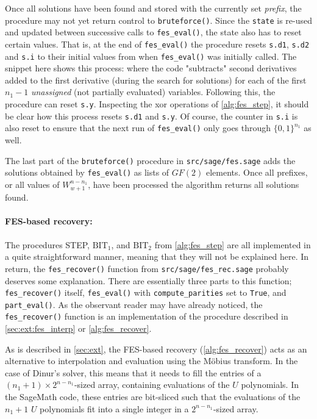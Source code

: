 Once all solutions have been found and stored with the currently set \textit{prefix}, the procedure may not yet return control to \texttt{bruteforce()}. Since the \texttt{state} is re-used and updated between successive calls to \texttt{fes\_eval()}, the state also has to reset certain values. That is, at the end of \texttt{fes\_eval()} the procedure resets \texttt{s.d1}, \texttt{s.d2} and \texttt{s.i} to their initial values from when \texttt{fes\_eval()} was initially called. The snippet here shows this process:
where the code "subtracts" second derivatives added to the first derivative (during the search for solutions) for each of the first $n_1-1$ \textit{unassigned} (not partially evaluated) variables. Following this, the procedure can reset \texttt{s.y}. Inspecting the xor operations of \cref{alg:fes_step}, it should be clear how this process resets \texttt{s.d1} and \texttt{s.y}. Of course, the counter in \texttt{s.i} is also reset to ensure that the next run of \texttt{fes\_eval()} only goes through $\{0,1\}^{n_1}$ as well. 

The last part of the \texttt{bruteforce()} procedure in \texttt{src/sage/fes.sage} adds the solutions obtained by \texttt{fes\_eval()} as lists of $GF(2)$ elements. Once all prefixes, or all values of $W^{n - n_1}_{w + 1}$, have been processed the algorithm returns all solutions found.

\paragraph{FES-based recovery:} The procedures STEP, $\text{BIT}_1$, and $\text{BIT}_2$ from \cref{alg:fes_step} are all implemented in a quite straightforward manner, meaning that they will not be explained here. In return, the \texttt{fes\_recover()} function from \texttt{src/sage/fes\_rec.sage} probably deserves some explanation. There are essentially three parts to this function; \texttt{fes\_recover()} itself, \texttt{fes\_eval()} with \texttt{compute\_parities} set to \texttt{True}, and \texttt{part\_eval()}. As the observant reader may have already noticed, the \texttt{fes\_recover()} function is an implementation of the procedure described in \cref{sec:ext:fes_interp} or \cref{alg:fes_recover}.

As is described in \cref{sec:ext}, the FES-based recovery (\cref{alg:fes_recover}) acts as an alternative to interpolation and evaluation using the Möbius transform. In the case of Dinur's solver, this means that it needs to fill the entries of a $(n_1 + 1) \times 2^{n - n_1}$-sized array, containing evaluations of the $U$ polynomials. In the SageMath code, these entries are bit-sliced such that the evaluations of the $n_1 + 1$ $U$ polynomials fit into a single integer in a $2^{n - n_1}$-sized array.

